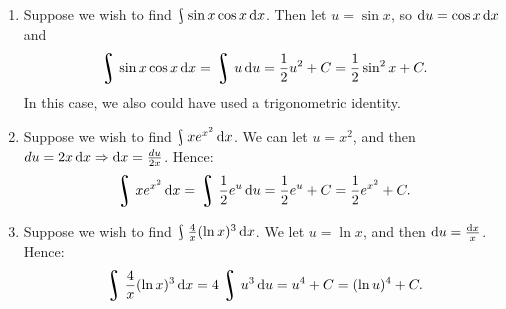 \begin{exs}\leavevmode
  \begin{enumerate}
    \item Suppose we wish to find $ \rint \sin x \cos x \dif{x} $. Then let $ u = \sin x $, so $ \dif{u} = \cos x \dif{x} $
          and
          \begin{displaymath}
            \rint \sin x \cos x \dif{x} = \rint u \dif{u} = \frac{1}{2} u^2 + C = \frac{1}{2} \sin^2 x + C.
          \end{displaymath}
          In this case, we also could have used a trigonometric identity.
    \item Suppose we wish to find $ \rint xe^{x^2} \dif{x} $. We can let $ u = x^2 $, and then $ du = 2x \dif{x} \Rightarrow \dif{x} = \frac{du}{2x} $.
          Hence:
          \begin{displaymath}
            \rint xe^{x^2} \dif{x} = \rint \frac{1}{2} e^u \dif{u} = \frac{1}{2} e^u + C = \frac{1}{2}e^{x^2} + C.
          \end{displaymath}
    \item Suppose we wish to find $ \rint \frac{4}{x} (\ln x)^3 \dif{x} $. We let $ u = \ln x $, and then $ \dif{u} = \frac{\dif{x}}{x} $.
          Hence:
          \begin{displaymath}
            \rint \frac{4}{x} (\ln x)^3 \dif{x} = 4\rint u^3 \dif{u} = u^4 + C = (\ln u)^4 + C.
          \end{displaymath}
  \end{enumerate}
\end{exs}

